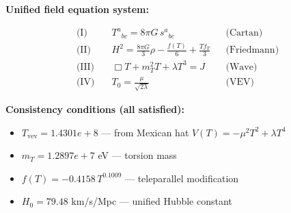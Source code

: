 
\textbf{Unified field equation system:}

\begin{align}
  \text{(I)} \quad & T^a{}_{bc} = 8\pi G \, s^a{}_{bc} && \text{(Cartan)} \\
  \text{(II)} \quad & H^2 = \frac{8\pi G}{3}\rho - \frac{f(T)}{6} + \frac{Tf_T}{3} && \text{(Friedmann)} \\
  \text{(III)} \quad & \Box T + m_T^2 T + \lambda T^3 = J && \text{(Wave)} \\
  \text{(IV)} \quad & T_0 = \frac{\mu}{\sqrt{2\lambda}} && \text{(VEV)}
\end{align}

\textbf{Consistency conditions (all satisfied):}
\begin{itemize}
  \item $T_{\text{vev}} = 1.4301e+8$ — from Mexican hat $V(T) = -\mu^2 T^2 + \lambda T^4$
  \item $m_T = 1.2897e+7$ eV — torsion mass
  \item $f(T) = -0.4158 \, T^{0.1009}$ — teleparallel modification
  \item $H_0 = 79.48$ km/s/Mpc — unified Hubble constant
\end{itemize}